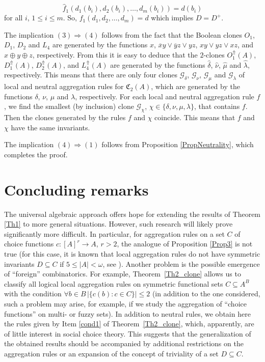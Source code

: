 \documentclass[graybox]{SNmult}
\theoremstyle{definition}
\begin{document}
$$
\widehat f_1(d_1(b_i), d_2(b_i), \ldots, d_m(b_i))=d(b_i) 
$$
for all $i$, $1\leq i\leq m$. So, $f_1(d_1, d_2, \ldots, d_m)=d$ which implies $D=D^+$.
\par The implication $(3)\Rightarrow (4)$ follows from the fact that the Boolean clones $O_1$, $D_1$, $D_2$ and $L_4$ are generated by the functions $x$, $\overline xy\vee \overline yz\vee yz$, $xy\vee yz\vee xz$, and $x\oplus y\oplus z$, respectively. From this it is easy to deduce that the $2$-clones $O_1^{\Uparrow}(A)$, $D_1^{\Uparrow}(A)$, $D_2^{\Uparrow}(A)$, and $L_4^{\Uparrow}(A)$ are generated by the functions $\widehat{\delta}$, $\widehat{\nu}$, $\widehat{\mu}$ and $\widehat{\lambda}$, respectively. This means that there are only four clones $\mathcal G_\delta$, $\mathcal G_\nu$, $\mathcal G_\mu$ and $\mathcal G_\lambda$ of local and neutral aggregation rules for $\mathfrak C_2(A)$, which are generated by the functions $\delta$, $\nu$, $\mu$ and $\lambda$, respectively. For each local and neutral aggregation rule $f$, we find the smallest (by inclusion) clone $\mathcal G_\chi$, $\chi\in \{\delta, \nu, \mu, \lambda\}$, that contains $f$. Then the clones generated by the rules $f$ and $\chi$ coincide. This means that $f$ and $\chi$ have the same invariants.
\par The implication $(4)\Rightarrow (1)$ follows from Proposition \ref{PropNeutrality}, which completes the proof. %

\section{Concluding remarks}

The universal algebraic approach offers hope for extending the results of Theorem \ref{Th1} to more general situations. However, such research will likely prove significantly more difficult. In particular, for aggregation rules on a set $C$ of choice functions $c: [A]^r\to A$, $r>2$, the analogue of Proposition \ref{Prop3} is not true (for this case, it is known that local aggregation rules do not have symmetric invariants $D\subseteq C$ if $5\leq |A|<\omega$, see \cite{Shelah,Polyakov1}). Another problem is the possible emergence of ``foreign'' combinatorics. For example, Theorem~\ref{Th2_clone} allows us to classify all logical local aggregation rules on symmetric functional sets $C\subseteq A^B$ with the condition $\forall b\in B\, |\{c(b): c\in C\}|\leq 2$ (in addition to the one considered, such a problem may arise, for example, if we study the aggregation of ``choice functions'' on multi- or fuzzy sets). In addition to neutral rules, we obtain here the rules given by Item \ref{cond1} of Theorem~\ref{Th2_clone}, which, apparently, are of little interest in social choice theory. This suggests that the generalization of the obtained results should be accompanied by additional restrictions on the aggregation rules or an expansion of the concept of triviality of a set $D\subseteq C$.
\end{document}
